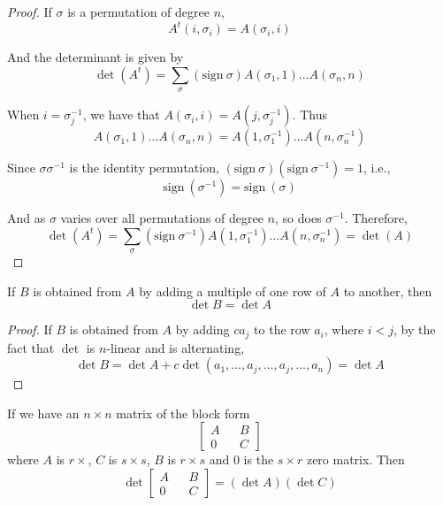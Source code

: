 \begin{proof}
	If $\sigma$ is a permutation of degree $n$,
	\[
		A^t(i, \sigma_i) = A(\sigma_i, i)
	\]
	
	And the determinant is given by
	\[
		\det(A^t) = \sum_\sigma (\text{sign} ~\sigma) A(\sigma_1, 1) \ldots A(\sigma_n, n)
	\]
	
	When $i = \sigma_j^{-1}$, we have that $A(\sigma_i, i) = A(j, \sigma_j^{-1})$. Thus
	\[
		A(\sigma_1, 1) \ldots A(\sigma_n, n) = A(1, \sigma_1^{-1}) \ldots A(n, \sigma_n^{-1})
	\]
	
	Since $\sigma \sigma^{-1}$ is the identity permutation, $(\text{sign} ~\sigma)(\text{sign} ~\sigma^{-1}) = 1$, i.e.,
	\[
		\text{sign}~(\sigma^{-1}) = \text{sign}~(\sigma)
	\]
	
	And as $\sigma$ varies over all permutations of degree $n$, so does $\sigma^{-1}$. Therefore,
	\[
		\det(A^t) = \sum_\sigma (\text{sign} ~\sigma^{-1}) A(1, \sigma_1^{-1}) \ldots A(n, \sigma_n^{-1}) = \det (A)
	\]
\end{proof}

\begin{theorem}
	If $B$ is obtained from $A$ by adding a multiple of one row of $A$ to another, then 
	\[
		\det B = \det A
	\]
\end{theorem}

\begin{proof}
	If $B$ is obtained from $A$ by adding $ca_j$ to the row $a_i$, where $i < j$, by the fact that $\det$ is $n$-linear and is alternating,
	\[
		\det B = \det A + c \det(a_1, \ldots, a_j, \ldots, a_j, \ldots, a_n) = \det A
	\]
\end{proof}

\begin{theorem}
	If we have an $n \times n$ matrix of the block form
	\[
		\begin{bmatrix}
			A && B \\
			0 && C
		\end{bmatrix}
	\]
	where $A$ is $r \times $, $C$ is $s \times s$, $B$ is $r \times s$ and $0$ is the $s \times r$ zero matrix. Then
	\[
		\det \begin{bmatrix}
			A && B \\
			0 && C
		\end{bmatrix} = (\det A)(\det C)
	\]
\end{theorem}

